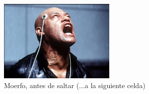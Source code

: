 \documentclass[11pt, a4paper, twoside]{article}
\begin{document}
\begin{samepage}
\begin{ejemplo}
\end{ejemplo}
 
\end{samepage}

\begin{figure}[b]
\centering
\includegraphics[width=0.5\textwidth]{morfeo.jpg}
\caption{Moerfo, antes de saltar {\footnotesize(...a la siguiente celda)}}
\end{figure}
\end{document}
